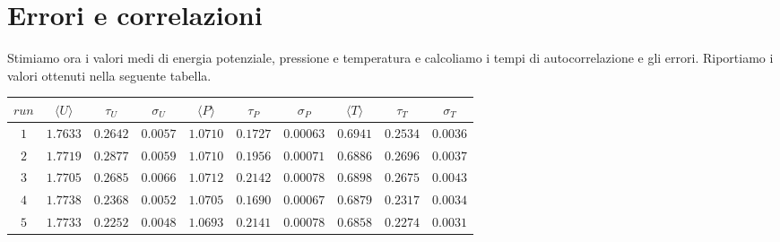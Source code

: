 \documentclass[a4paper,11pt]{article}
\begin{document}
\section*{Errori e correlazioni}
Stimiamo ora i valori medi di energia potenziale, pressione e temperatura e calcoliamo i tempi di autocorrelazione e gli errori. Riportiamo i valori ottenuti nella seguente tabella.
\begin{table}[H]
	\centering
	\begin{tabular}{cccccccccc} 
		\hline
		$run$	&	$\langle U  \rangle$	&	$\tau_U$	&	$\sigma_U$ & $\langle P  \rangle$	&	$\tau_P$	&	$\sigma_P$ & $\langle T \rangle$	&	$\tau_T$ & $\sigma_T$ \\
		\hline
		$1$	&	$1.7633$ &	$0.2642$ &	$0.0057$ &	$1.0710$ &	$0.1727$&	$0.00063$&	$0.6941$&	$0.2534$ &	$0.0036$ \\
		$2$	&	$1.7719$ &	$0.2877$ &	$0.0059$ &	$1.0710$ &	$0.1956$&	$0.00071$ &	$0.6886$&	$0.2696$ &	$0.0037$   \\
		$3$	&	$1.7705$ &	$0.2685$ &	$0.0066$ &	$1.0712$ &	$0.2142$&	$0.00078$ &	$0.6898$&	$0.2675$ &	$0.0043$  \\
		$4$	&	$1.7738$ &	$0.2368$ &	$0.0052$ &	$1.0705$ &	$0.1690$&	$0.00067$ &	$0.6879$&	$0.2317$ &	$0.0034$  \\
		$5$	&	$1.7733$ &	$0.2252$ &	$0.0048$ &	$1.0693$ &	$0.2141$&	$0.00078$ &	$0.6858$&	$0.2274$ &	$0.0031$  \\\hline
	\end{tabular}
\end{table}
\medskip

 
\end{document}
